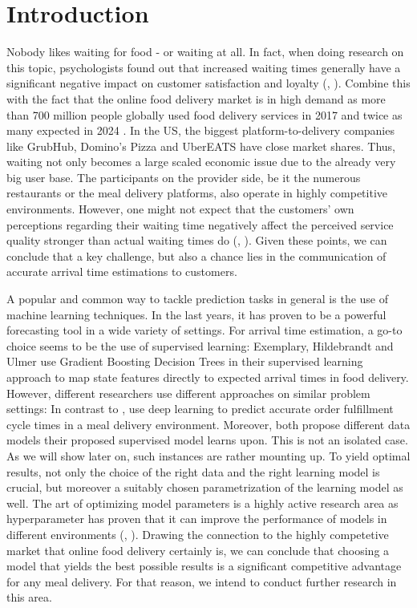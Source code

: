 \chapter{Introduction}
Nobody likes waiting for food - or waiting at all. In fact, when doing research on this topic, psychologists found out that increased waiting times generally have a significant negative impact on customer satisfaction and loyalty (\citealt{WaitingTime1}, \citealt{WaitingTime2}). Combine this with the fact that the online food delivery market is in high demand as more than 700 million people globally used food delivery services in 2017 and twice as many expected in 2024 \citep{Statista1}. In the US, the biggest platform-to-delivery companies like GrubHub, Domino's Pizza and UberEATS have close market shares. Thus, waiting not only becomes a large scaled economic issue due to the already very big user base. The participants on the provider side, be it the numerous restaurants or the meal delivery platforms, also operate in highly competitive environments. However, one might not expect that the customers’ own perceptions regarding their waiting time negatively affect the perceived service quality stronger than actual waiting times do (\citealt{waiting5}, \citealt{waiting6}). Given these points, we can conclude that a key challenge, but also a chance lies in the communication of accurate arrival time estimations to customers. 

A popular and common way to tackle prediction tasks in general is the use of machine learning techniques. In the last years, it has proven to be a powerful forecasting tool in a wide variety of settings. For arrival time estimation, a go-to choice seems to be the use of supervised learning: Exemplary, Hildebrandt and Ulmer use Gradient Boosting Decision Trees in their supervised learning approach to map state features directly to expected arrival times in food delivery. However, different researchers use different approaches on similar problem settings: In contrast to \cite{Hildebrandt2020_EAT}, \cite{Zhu2020_OFCTE_DL} use deep learning to predict accurate order fulfillment cycle times in a meal delivery environment. Moreover, both propose different data models their proposed supervised model learns upon. This is not an isolated case. As we will show later on, such instances are rather mounting up. 
To yield optimal results, not only the choice of the right data and the right learning model is crucial, but moreover a suitably chosen parametrization of the learning model as well. The art of optimizing model parameters is a highly active research area as hyperparameter has proven that it can improve the performance of models in different environments (\citealt{HPOMotivation}, \citealt{WU201926}).
Drawing the connection to the highly competetive market that online food delivery certainly is, we can conclude that choosing a model that yields the best possible results is a significant competitive advantage for any meal delivery. For that reason, we intend to conduct further research in this area.

